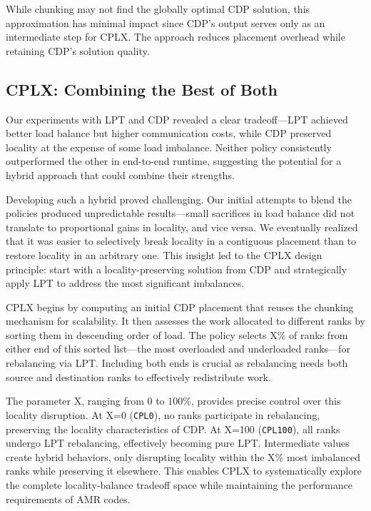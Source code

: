 While chunking may not find the globally optimal CDP solution, this approximation has minimal
impact since CDP's output serves only as an intermediate step for CPLX.
The approach reduces placement overhead while retaining CDP's solution quality.

\subsection{CPLX: Combining the Best of Both}\label{sec:amr:des:cplx}

\enlargethispage{\baselineskip}
Our experiments with LPT and CDP revealed a clear tradeoff---LPT achieved better load balance but
higher communication costs, while CDP preserved locality at the expense of some load imbalance.
Neither policy consistently outperformed the other in end-to-end runtime, suggesting the potential
for a hybrid approach that could combine their strengths.

Developing such a hybrid proved challenging.
Our initial attempts to blend the policies produced unpredictable results---small sacrifices in
load balance did not translate to proportional gains in locality, and vice versa.
We eventually realized that it was easier to selectively break locality in a contiguous placement
than to restore locality in an arbitrary one.
This insight led to the CPLX design principle: start with a locality-preserving solution from CDP
and strategically apply LPT to address the most significant imbalances.

CPLX begins by computing an initial CDP placement that reuses the chunking mechanism for
scalability.
It then assesses the work allocated to different ranks by sorting them in descending order of load.
The policy selects X\% of ranks from either end of this sorted list---the most overloaded and
underloaded ranks---for rebalancing via LPT.
Including both ends is crucial as rebalancing needs both source and destination ranks to
effectively redistribute work.

The parameter X, ranging from 0 to 100\%, provides precise control over this locality disruption.
At X=0 (\texttt{CPL0}), no ranks participate in rebalancing, preserving the locality
characteristics of CDP.
At X=100 (\texttt{CPL100}), all ranks undergo LPT rebalancing, effectively becoming pure LPT.
Intermediate values create hybrid behaviors, only disrupting locality within the X\% most
imbalanced ranks while preserving it elsewhere.
This enables CPLX to systematically explore the complete locality-balance tradeoff space while
maintaining the performance requirements of AMR codes.
